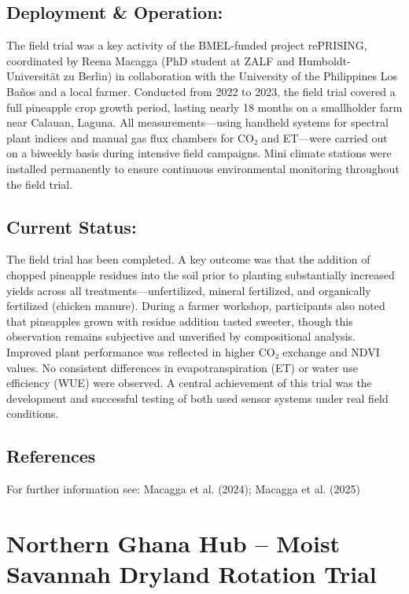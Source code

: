 \documentclass[
  11pt,
  letterpaper,
]{book}
\begin{document}
\subsection{Deployment \&
Operation:}\label{sec-philippine-hub-deployment}

The field trial was a key activity of the BMEL-funded project rePRISING,
coordinated by Reena Macagga (PhD student at ZALF and
Humboldt-Universität zu Berlin) in collaboration with the University of
the Philippines Los Baños and a local farmer. Conducted from 2022 to
2023, the field trial covered a full pineapple crop growth period,
lasting nearly 18 months on a smallholder farm near Calauan, Laguna. All
measurements---using handheld systems for spectral plant indices and
manual gas flux chambers for CO₂ and ET---were carried out on a biweekly
basis during intensive field campaigns. Mini climate stations were
installed permanently to ensure continuous environmental monitoring
throughout the field trial.

\subsection{Current Status:}\label{sec-philippine-hub-status}

The field trial has been completed. A key outcome was that the addition
of chopped pineapple residues into the soil prior to planting
substantially increased yields across all treatments---unfertilized,
mineral fertilized, and organically fertilized (chicken manure). During
a farmer workshop, participants also noted that pineapples grown with
residue addition tasted sweeter, though this observation remains
subjective and unverified by compositional analysis. Improved plant
performance was reflected in higher CO₂ exchange and NDVI values. No
consistent differences in evapotranspiration (ET) or water use
efficiency (WUE) were observed. A central achievement of this trial was
the development and successful testing of both used sensor systems under
real field conditions.

\subsection{References}\label{sec-philippine-hub-references}

For further information see: Macagga et al. (2024); Macagga et al.
(2025)

\section{Northern Ghana Hub -- Moist Savannah Dryland Rotation
Trial}\label{northern-ghana-hub-moist-savannah-dryland-rotation-trial}
\end{document}

